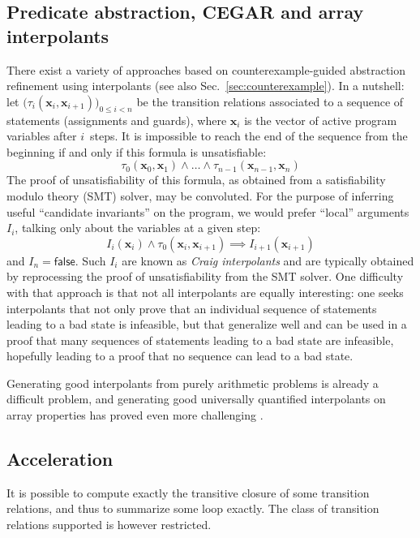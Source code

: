 \documentclass[a4paper]{article}
\newcommand{\ve}[1]{\mathbf{#1}}
\newcommand{\vx}{\ve{x}}
\theoremstyle{definition}
\theoremstyle{plain}
\begin{document}
\subsection{Predicate abstraction, CEGAR and array interpolants}
There exist a variety of approaches based on counterexample-guided abstraction refinement using interpolants (see also Sec.~\ref{sec:counterexample}).
In a nutshell: let $\big(\tau_i(\vx_i,\vx_{i+1})\big)_{0 \leq i < n}$ be the transition relations associated to a sequence of statements (assignments and guards), where $\vx_i$ is the vector of active program variables after $i$~steps.
It is impossible to reach the end of the sequence from the beginning if and only if this formula is unsatisfiable:
\begin{equation}
\tau_0(\vx_0,\vx_1) \land \dots \land \tau_{n-1}(\vx_{n-1},\vx_n)
\end{equation}
The proof of unsatisfiability of this formula, as obtained from a satisfiability modulo theory (SMT) solver, may be convoluted. For the purpose of inferring useful ``candidate invariants'' on the program, we would prefer ``local'' arguments $I_i$, talking only about the variables at a given step:
\begin{equation}
I_i(\vx_i) \land \tau_0(\vx_i,\vx_{i+1}) \implies I_{i+1}(\vx_{i+1})
\end{equation}
and $I_n = \mathsf{false}$.
Such $I_i$ are known as \emph{Craig interpolants} \cite{DBLP:conf/apn/McMillan05,McMillan06,McMillan11} and are typically obtained by reprocessing the proof of unsatisfiability from the SMT solver.
One difficulty with that approach is that not all interpolants are equally interesting: one seeks interpolants that not only prove that an individual sequence of statements leading to a bad state is infeasible, but that generalize well and can be used in a proof that many sequences of statements leading to a bad state are infeasible, hopefully leading to a proof that no sequence can lead to a bad state.

Generating good interpolants from purely arithmetic problems is already a difficult problem, and generating good universally quantified interpolants on array properties has proved even more challenging \cite{JhalaM07,AlbertiBGRS14,Alberti_Monniaux_SAC-SVT2015}.

\subsection{Acceleration}
It is possible to compute exactly the transitive closure of some transition relations, and thus to summarize some loop exactly. The class of transition relations supported is however restricted.
\end{document}
